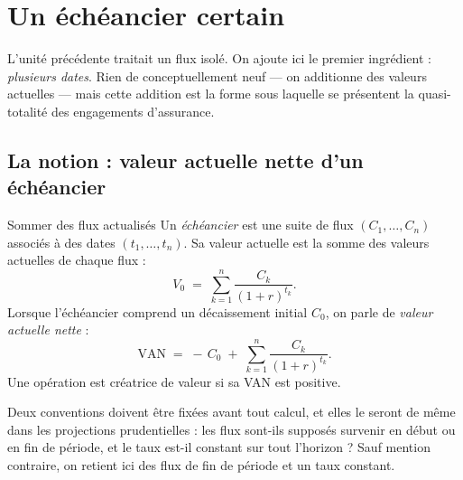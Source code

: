 \section{Un échéancier certain}
\label{sec:U2}

L'unité précédente traitait un flux isolé. On ajoute ici le premier ingrédient :
\emph{plusieurs dates}. Rien de conceptuellement neuf --- on additionne des
valeurs actuelles --- mais cette addition est la forme sous laquelle se
présentent la quasi-totalité des engagements d'assurance.

\subsection{La notion : valeur actuelle nette d'un échéancier}

\begin{notion}{Sommer des flux actualisés}
Un \emph{échéancier} est une suite de flux $(C_1,\dots,C_n)$
associés à des dates $(t_1,\dots,t_n)$. Sa valeur actuelle est la somme des
valeurs actuelles de chaque flux :
\[
  V_0 \;=\; \sum_{k=1}^{n} \frac{C_k}{(1+r)^{t_k}}.
\]
Lorsque l'échéancier comprend un décaissement initial $C_0$, on parle de
\emph{valeur actuelle nette} :
\[
  \mathrm{VAN} \;=\; -\,C_0 \;+\; \sum_{k=1}^{n} \frac{C_k}{(1+r)^{t_k}}.
\]
Une opération est créatrice de valeur si sa VAN est positive.
\end{notion}

Deux conventions doivent être fixées avant tout calcul, et elles le seront de
même dans les projections prudentielles : les flux sont-ils supposés survenir en
début ou en fin de période, et le taux est-il constant sur tout l'horizon ? Sauf
mention contraire, on retient ici des flux de fin de période et un taux constant.

\begin{center}
\end{center}

